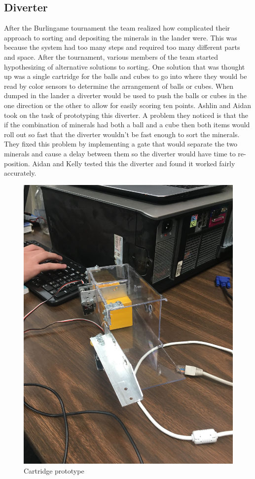\documentclass{article}
\begin{document}
\subsection{Diverter}
After the Burlingame tournament the team realized how complicated their approach to sorting and depositing the minerals in the lander were. This was because the system had too many steps and required too many different parts and space. After the tournament, various members of the team started hypothesizing of alternative solutions to sorting. One solution that was thought up was a single cartridge for the balls and cubes to go into where they would be read by color sensors to determine the arrangement of balls or cubes. When dumped in the lander a diverter would be used to push the balls or cubes in the one direction or the other to allow for easily scoring ten points. Ashlin and Aidan took on the task of prototyping this diverter. A problem they noticed is that the if the combination of minerals had both a ball and a cube then both items would roll out so fast that the diverter wouldn't be fast enough to sort the minerals. They fixed this problem by implementing a gate that would separate the two minerals and cause a delay between them so the diverter would have time to re-position. Aidan and Kelly tested this the diverter and found it worked fairly accurately.

\begin{figure}
    \centering
    \includegraphics[width=.6 \textwidth]{14_12-03/images/cartridge3.JPG}
    \caption{Cartridge prototype}
    \label{fig:thing}
\end{figure}
\end{document}
